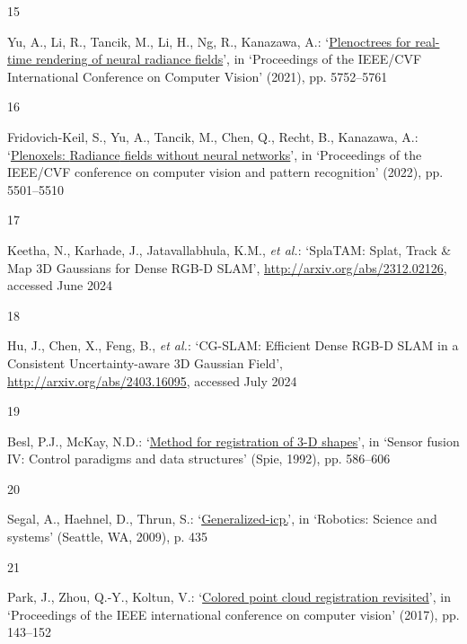 \documentclass[twocolumn]{article} %
\newlength{\cslhangindent}
\newlength{\csllabelwidth}
\newenvironment{CSLReferences}[2] %
{\begin{list}{}{%
  \setlength{\itemindent}{0pt}
  \setlength{\leftmargin}{0pt}
  \setlength{\parsep}{0pt}
  \ifodd #1
  \setlength{\leftmargin}{\cslhangindent}
  \setlength{\itemindent}{-1\cslhangindent}
  \fi
  \setlength{\itemsep}{0.5\baselineskip}}}
{\end{list}}
\newcommand{\CSLLeftMargin}[1]{\parbox[t]{\csllabelwidth}{\strut#1\strut}}
\newcommand{\CSLRightInline}[1]{\parbox[t]{\linewidth - \csllabelwidth}{\strut#1\strut}}
\begin{document}
\begin{CSLReferences}{0}{1}
\CSLLeftMargin{15 }%
\CSLRightInline{Yu, A., Li, R., Tancik, M., Li, H., Ng, R., Kanazawa,
A.:
{`\href{http://openaccess.thecvf.com/content/ICCV2021/html/Yu_PlenOctrees_for_Real-Time_Rendering_of_Neural_Radiance_Fields_ICCV_2021_paper.html}{Plenoctrees
for real-time rendering of neural radiance fields}'}, in {`Proceedings
of the {IEEE}/{CVF International Conference} on {Computer Vision}'}
(2021), pp. 5752--5761}

\CSLLeftMargin{16 }%
\CSLRightInline{Fridovich-Keil, S., Yu, A., Tancik, M., Chen, Q., Recht,
B., Kanazawa, A.:
{`\href{http://openaccess.thecvf.com/content/CVPR2022/html/Fridovich-Keil_Plenoxels_Radiance_Fields_Without_Neural_Networks_CVPR_2022_paper.html}{Plenoxels:
{Radiance} fields without neural networks}'}, in {`Proceedings of the
{IEEE}/{CVF} conference on computer vision and pattern recognition'}
(2022), pp. 5501--5510}

\CSLLeftMargin{17 }%
\CSLRightInline{Keetha, N., Karhade, J., Jatavallabhula, K.M., \emph{et
al.}: {`{SplaTAM}: {Splat}, {Track} \& {Map 3D Gaussians} for {Dense
RGB-D SLAM}'}, \url{http://arxiv.org/abs/2312.02126}, accessed June
2024}

\CSLLeftMargin{18 }%
\CSLRightInline{Hu, J., Chen, X., Feng, B., \emph{et al.}: {`{CG-SLAM}:
{Efficient Dense RGB-D SLAM} in a {Consistent Uncertainty-aware 3D
Gaussian Field}'}, \url{http://arxiv.org/abs/2403.16095}, accessed July
2024}

\CSLLeftMargin{19 }%
\CSLRightInline{Besl, P.J., McKay, N.D.:
{`\href{https://doi.org/10.1117/12.57955}{Method for registration of
3-{D} shapes}'}, in {`Sensor fusion {IV}: Control paradigms and data
structures'} (Spie, 1992), pp. 586--606}

\CSLLeftMargin{20 }%
\CSLRightInline{Segal, A., Haehnel, D., Thrun, S.:
{`\href{https://doi.org/10.15607/RSS.2009.V.021}{Generalized-icp.}'}, in
{`Robotics: Science and systems'} (Seattle, WA, 2009), p. 435}

\CSLLeftMargin{21 }%
\CSLRightInline{Park, J., Zhou, Q.-Y., Koltun, V.:
{`\href{http://openaccess.thecvf.com/content_iccv_2017/html/Park_Colored_Point_Cloud_ICCV_2017_paper.html}{Colored
point cloud registration revisited}'}, in {`Proceedings of the {IEEE}
international conference on computer vision'} (2017), pp. 143--152}


\end{CSLReferences}
\end{document}
